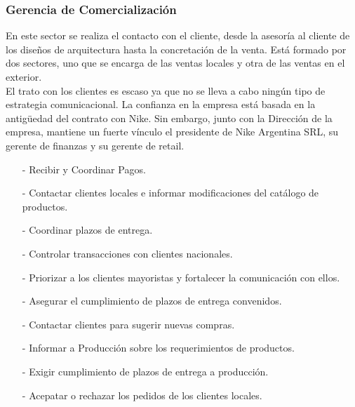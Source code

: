 \documentclass[a4paper,10pt,titlepage]{article}
\begin{document}

\newpage

\subsubsection{Gerencia de Comercializaci\'on}

En este sector se realiza el contacto con el cliente, desde la asesor\'ia al cliente de los dise\~nos de arquitectura 
hasta la concretaci\'on de la venta. Est\'a formado por dos sectores, uno que se encarga de las ventas locales y otra
de las ventas en el exterior.\\
El trato con los clientes es escaso ya que no se lleva a cabo ning\'un tipo de estrategia comunicacional. La confianza 
en la empresa est\'a basada en la antig\"uedad del contrato con Nike. Sin embargo, junto con la Direcci\'on de 
la empresa, mantiene un fuerte v\'inculo el presidente de Nike Argentina SRL, su gerente de finanzas y su gerente de retail.
\smallskip

{
    \begin{itemize}
	\item[-] Recibir y Coordinar Pagos.
	\item[-] Contactar clientes locales e informar modificaciones del cat\'alogo de productos. 
	\item[-] Coordinar plazos de entrega.
	\item[-] Controlar transacciones con clientes nacionales.
    \end{itemize}
}
{
    \begin{itemize}
	\item[-] Priorizar a los clientes mayoristas y fortalecer la comunicaci\'on con ellos.
	\item[-] Asegurar el cumplimiento de plazos de entrega convenidos.
	\item[-] Contactar clientes para sugerir nuevas compras.
	\item[-] Informar a Producci\'on sobre los requerimientos de productos.
    \end{itemize}
}
{
      \begin{itemize}
	\item[-] Exigir cumplimiento de plazos de entrega a producci\'on.
	\item[-] Acepatar o rechazar los pedidos de los clientes locales.
      \end{itemize}
}
\end{document}
